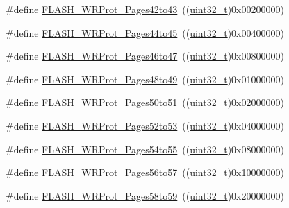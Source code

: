 \begin{DoxyCompactItemize}
\#define \hyperlink{group___option___bytes___write___protection_gab9583317ad7ec30119cdd97e17e74121}{F\+L\+A\+S\+H\+\_\+\+W\+R\+Prot\+\_\+\+Pages42to43}~((\hyperlink{_p_e___types_8h_a33594304e786b158f3fb30289278f5af}{uint32\+\_\+t})0x00200000)
\item 
\#define \hyperlink{group___option___bytes___write___protection_ga934a862a6a5cd350f00f5ded27e4bbd4}{F\+L\+A\+S\+H\+\_\+\+W\+R\+Prot\+\_\+\+Pages44to45}~((\hyperlink{_p_e___types_8h_a33594304e786b158f3fb30289278f5af}{uint32\+\_\+t})0x00400000)
\item 
\#define \hyperlink{group___option___bytes___write___protection_ga8c9bd2510c0af75911a6b24271a33c95}{F\+L\+A\+S\+H\+\_\+\+W\+R\+Prot\+\_\+\+Pages46to47}~((\hyperlink{_p_e___types_8h_a33594304e786b158f3fb30289278f5af}{uint32\+\_\+t})0x00800000)
\item 
\#define \hyperlink{group___option___bytes___write___protection_ga12744383aa65b2eb38e37d41a12bb6fe}{F\+L\+A\+S\+H\+\_\+\+W\+R\+Prot\+\_\+\+Pages48to49}~((\hyperlink{_p_e___types_8h_a33594304e786b158f3fb30289278f5af}{uint32\+\_\+t})0x01000000)
\item 
\#define \hyperlink{group___option___bytes___write___protection_ga053321e47944270a5fdcf0d58e16ec13}{F\+L\+A\+S\+H\+\_\+\+W\+R\+Prot\+\_\+\+Pages50to51}~((\hyperlink{_p_e___types_8h_a33594304e786b158f3fb30289278f5af}{uint32\+\_\+t})0x02000000)
\item 
\#define \hyperlink{group___option___bytes___write___protection_gae4eefefb23e8913e4aa558a6a2599fa5}{F\+L\+A\+S\+H\+\_\+\+W\+R\+Prot\+\_\+\+Pages52to53}~((\hyperlink{_p_e___types_8h_a33594304e786b158f3fb30289278f5af}{uint32\+\_\+t})0x04000000)
\item 
\#define \hyperlink{group___option___bytes___write___protection_gacd4ea5e6cc3819f40a55a61f3075b626}{F\+L\+A\+S\+H\+\_\+\+W\+R\+Prot\+\_\+\+Pages54to55}~((\hyperlink{_p_e___types_8h_a33594304e786b158f3fb30289278f5af}{uint32\+\_\+t})0x08000000)
\item 
\#define \hyperlink{group___option___bytes___write___protection_ga1779d1131ad245861c61dbf43a2d2d3d}{F\+L\+A\+S\+H\+\_\+\+W\+R\+Prot\+\_\+\+Pages56to57}~((\hyperlink{_p_e___types_8h_a33594304e786b158f3fb30289278f5af}{uint32\+\_\+t})0x10000000)
\item 
\#define \hyperlink{group___option___bytes___write___protection_ga4a05bf4eec7521ae90ff662db2a9f4f5}{F\+L\+A\+S\+H\+\_\+\+W\+R\+Prot\+\_\+\+Pages58to59}~((\hyperlink{_p_e___types_8h_a33594304e786b158f3fb30289278f5af}{uint32\+\_\+t})0x20000000)
\item 

\end{DoxyCompactItemize}
